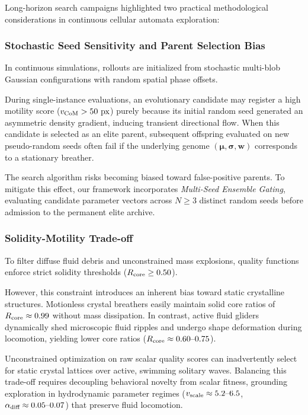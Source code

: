 Long-horizon search campaigns highlighted two practical methodological considerations in continuous cellular automata exploration:

\subsubsection{Stochastic Seed Sensitivity and Parent Selection Bias}
In continuous simulations, rollouts are initialized from stochastic multi-blob Gaussian configurations with random spatial phase offsets. 

During single-instance evaluations, an evolutionary candidate may register a high motility score ($v_{\text{CoM}} > 50\text{ px}$) purely because its initial random seed generated an asymmetric density gradient, inducing transient directional flow. When this candidate is selected as an elite parent, subsequent offspring evaluated on new pseudo-random seeds often fail if the underlying genome $(\boldsymbol{\mu}, \boldsymbol{\sigma}, \mathbf{w})$ corresponds to a stationary breather. 

The search algorithm risks becoming biased toward false-positive parents. To mitigate this effect, our framework incorporates \textit{Multi-Seed Ensemble Gating}, evaluating candidate parameter vectors across $N \ge 3$ distinct random seeds before admission to the permanent elite archive.

\subsubsection{Solidity-Motility Trade-off}
To filter diffuse fluid debris and unconstrained mass explosions, quality functions enforce strict solidity thresholds ($R_{\text{core}} \ge 0.50$). 

However, this constraint introduces an inherent bias toward static crystalline structures. Motionless crystal breathers easily maintain solid core ratios of $R_{\text{core}} \approx 0.99$ without mass dissipation. In contrast, active fluid gliders dynamically shed microscopic fluid ripples and undergo shape deformation during locomotion, yielding lower core ratios ($R_{\text{core}} \approx 0.60\text{--}0.75$). 

Unconstrained optimization on raw scalar quality scores can inadvertently select for static crystal lattices over active, swimming solitary waves. Balancing this trade-off requires decoupling behavioral novelty from scalar fitness, grounding exploration in hydrodynamic parameter regimes ($v_{\text{scale}} \approx 5.2\text{--}6.5$, $\alpha_{\text{diff}} \approx 0.05\text{--}0.07$) that preserve fluid locomotion.